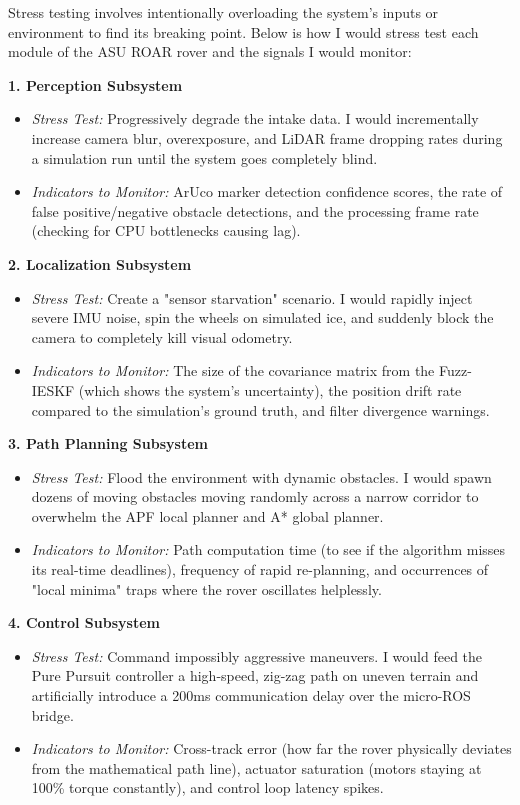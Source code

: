 \documentclass[12pt,a4paper]{article}
\begin{document}
Stress testing involves intentionally overloading the system's inputs or environment to find its breaking point. Below is how I would stress test each module of the ASU ROAR rover and the signals I would monitor:

\noindent\textbf{1. Perception Subsystem}
\begin{itemize}[leftmargin=*]
    \item \textit{Stress Test:} Progressively degrade the intake data. I would incrementally increase camera blur, overexposure, and LiDAR frame dropping rates during a simulation run until the system goes completely blind.
    \item \textit{Indicators to Monitor:} ArUco marker detection confidence scores, the rate of false positive/negative obstacle detections, and the processing frame rate (checking for CPU bottlenecks causing lag).
\end{itemize}

\noindent\textbf{2. Localization Subsystem}
\begin{itemize}[leftmargin=*]
    \item \textit{Stress Test:} Create a "sensor starvation" scenario. I would rapidly inject severe IMU noise, spin the wheels on simulated ice, and suddenly block the camera to completely kill visual odometry.
    \item \textit{Indicators to Monitor:} The size of the covariance matrix from the Fuzz-IESKF (which shows the system's uncertainty), the position drift rate compared to the simulation's ground truth, and filter divergence warnings.
\end{itemize}

\noindent\textbf{3. Path Planning Subsystem}
\begin{itemize}[leftmargin=*]
    \item \textit{Stress Test:} Flood the environment with dynamic obstacles. I would spawn dozens of moving obstacles moving randomly across a narrow corridor to overwhelm the APF local planner and A* global planner.
    \item \textit{Indicators to Monitor:} Path computation time (to see if the algorithm misses its real-time deadlines), frequency of rapid re-planning, and occurrences of "local minima" traps where the rover oscillates helplessly.
\end{itemize}

\noindent\textbf{4. Control Subsystem}
\begin{itemize}[leftmargin=*]
    \item \textit{Stress Test:} Command impossibly aggressive maneuvers. I would feed the Pure Pursuit controller a high-speed, zig-zag path on uneven terrain and artificially introduce a 200ms communication delay over the micro-ROS bridge.
    \item \textit{Indicators to Monitor:} Cross-track error (how far the rover physically deviates from the mathematical path line), actuator saturation (motors staying at 100\% torque constantly), and control loop latency spikes.
\end{itemize}
\end{document}
